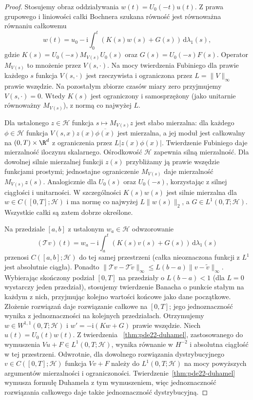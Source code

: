 \begin{proof}
Stosujemy obraz oddziaływania $w(t)=U_0(-t)u(t)$.
Z prawa grupowego i liniowości całki Bochnera
szukana równość jest równoważna równaniu całkowemu
\[
 w(t)=u_0-\mathrm i\int_0^t(K(s)w(s)+G(s))\,\mathrm d\lambda_1(s),
\]
gdzie $K(s)=U_0(-s)M_{V(s)}U_0(s)$ oraz
$G(s)=U_0(-s)F(s)$. Operator $M_{V(s)}$ to mnożenie
przez $V(s,\cdot)$.
Na mocy twierdzenia Fubiniego dla prawie każdego
$s$ funkcja $V(s,\cdot)$ jest rzeczywista i ograniczona
przez $L=\|V\|_\infty$ prawie wszędzie. Na pozostałym
zbiorze czasów miary zero przyjmujemy $V(s,\cdot)=0$.
Wtedy $K(s)$ jest ograniczony i samosprzężony
(jako unitarnie równoważny $M_{V(s)}$),
z normą co najwyżej $L$.

Dla ustalonego $z\in\mathcal H$ funkcja
$s\mapsto M_{V(s)}z$ jest słabo mierzalna:
dla każdego $\phi\in\mathcal H$ funkcja
$V(s,x)z(x)\overline{\phi(x)}$ jest mierzalna,
a jej moduł jest całkowalny na $(0,T)\times\R^d$
z ograniczenia przez $L|z(x)\phi(x)|$.
Twierdzenie Fubiniego daje mierzalność iloczynu
skalarnego. Ośrodkowość $\mathcal H$ zapewnia
silną mierzalność. Dla dowolnej silnie mierzalnej
funkcji $z(s)$ przybliżamy ją prawie wszędzie
funkcjami prostymi; jednostajne ograniczenie
$M_{V(s)}$ daje mierzalność $M_{V(s)}z(s)$.
Analogicznie dla $U_0(s)$ oraz $U_0(-s)$,
korzystając z silnej ciągłości i unitarności.
W szczególności $K(s)w(s)$ jest silnie mierzalna
dla $w\in C([0,T];\mathcal H)$ i ma normę co
najwyżej $L\|w(s)\|_2$, a $G\in L^1(0,T;\mathcal H)$.
Wszystkie całki są zatem dobrze określone.

Na przedziale $[a,b]$ z ustalonym $w_a\in\mathcal H$
odwzorowanie
\[
 (\mathcal Tv)(t)=w_a-\mathrm i
     \int_a^t(K(s)v(s)+G(s))\,\mathrm d\lambda_1(s)
\]
przenosi $C([a,b];\mathcal H)$ do tej samej
przestrzeni (całka nieoznaczona funkcji z $L^1$
jest absolutnie ciągła). Ponadto
$\|\mathcal Tv-\mathcal T\widetilde v\|_\infty
\le L(b-a)\|v-\widetilde v\|_\infty$.
Wybierając skończony podział $[0,T]$ na przedziały
o $L(b-a)<1$ (dla $L=0$ wystarczy jeden przedział),
stosujemy twierdzenie Banacha o punkcie stałym
na każdym z nich, przyjmując kolejno wartości
końcowe jako dane początkowe. Złożenie rozwiązań
daje rozwiązanie całkowe na $[0,T]$; jego
jednoznaczność wynika z jednoznaczności na
kolejnych przedziałach.
Otrzymujemy $w\in W^{1,1}(0,T;\mathcal H)$ i
$w'=-\mathrm i(Kw+G)$ prawie wszędzie.
Niech $u(t)=U_0(t)w(t)$. Z twierdzenia
~\ref{thm:pde22-duhamel}, zastosowanego do
wymuszenia $Vu+F\in L^1(0,T;\mathcal H)$,
wynika równanie w $H^{-2}$ i absolutna ciągłość
w tej przestrzeni. Odwrotnie, dla dowolnego
rozwiązania dystrybucyjnego $v\in C([0,T];\mathcal H)$
funkcja $Vv+F$ należy do $L^1(0,T;\mathcal H)$
na mocy powyższych argumentów mierzalności
i ograniczoności. Twierdzenie~\ref{thm:pde22-duhamel}
wymusza formułę Duhamela z tym wymuszeniem,
więc jednoznaczność rozwiązania całkowego
daje także jednoznaczność dystrybucyjną.


\end{proof}
